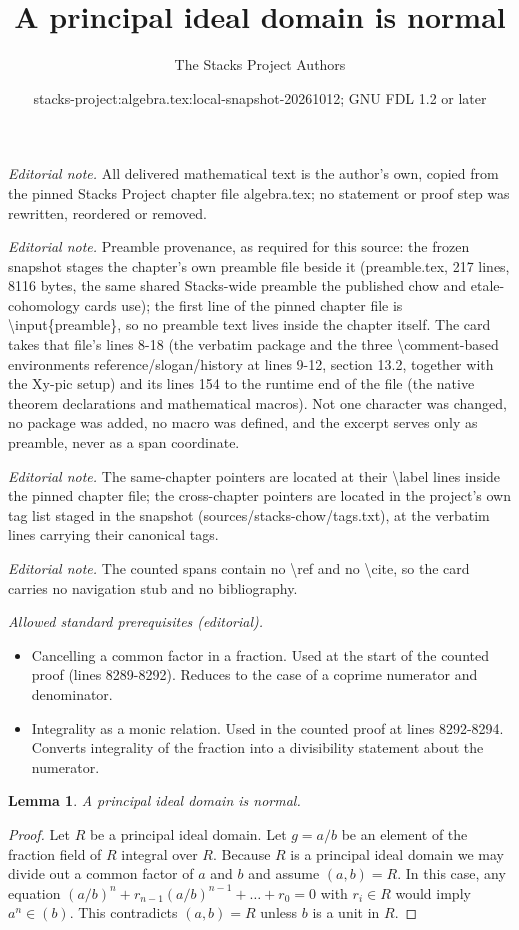 \documentclass[10pt,a4paper]{amsart}
\title{A principal ideal domain is normal}
\author{The Stacks Project Authors}
\date{stacks-project:algebra.tex:local-snapshot-20261012; GNU FDL 1.2 or later}
\theoremstyle{plain}
\newtheorem{lemma}[subsection]{Lemma}
\theoremstyle{definition}
\theoremstyle{remark}
\numberwithin{equation}{subsection}
\begin{document}
\maketitle
\noindent\textit{Editorial note.} All delivered mathematical text is the author's own, copied from the pinned Stacks Project chapter file algebra.tex; no statement or proof step was rewritten, reordered or removed.\par\medskip
\noindent\textit{Editorial note.} Preamble provenance, as required for this source: the frozen snapshot stages the chapter's own preamble file beside it (preamble.tex, 217 lines, 8116 bytes, the same shared Stacks-wide preamble the published chow and etale-cohomology cards use); the first line of the pinned chapter file is \textbackslash{}input\{preamble\}, so no preamble text lives inside the chapter itself. The card takes that file's lines 8-18 (the verbatim package and the three \textbackslash{}comment-based environments reference/slogan/history at lines 9-12, section 13.2, together with the Xy-pic setup) and its lines 154 to the runtime end of the file (the native theorem declarations and mathematical macros). Not one character was changed, no package was added, no macro was defined, and the excerpt serves only as preamble, never as a span coordinate.\par\medskip
\noindent\textit{Editorial note.} The same-chapter pointers are located at their \textbackslash{}label lines inside the pinned chapter file; the cross-chapter pointers are located in the project's own tag list staged in the snapshot (sources/stacks-chow/tags.txt), at the verbatim lines carrying their canonical tags.\par\medskip
\noindent\textit{Editorial note.} The counted spans contain no \textbackslash{}ref and no \textbackslash{}cite, so the card carries no navigation stub and no bibliography.\par\medskip
\noindent\textit{Allowed standard prerequisites (editorial).}\begin{itemize}
\item Cancelling a common factor in a fraction. Used at the start of the counted proof (lines 8289-8292). Reduces to the case of a coprime numerator and denominator.
\item Integrality as a monic relation. Used in the counted proof at lines 8292-8294. Converts integrality of the fraction into a divisibility statement about the numerator.
\end{itemize}\medskip
\begin{lemma}
\label{lemma-PID-normal}
A principal ideal domain is normal.
\end{lemma}

\begin{proof}
Let $R$ be a principal ideal domain.
Let $g = a/b$ be an element of the fraction field
of $R$ integral over $R$. Because $R$ is a principal ideal domain
we may divide out a common factor of $a$ and $b$
and assume $(a, b) = R$. In this case, any equation
$(a/b)^n + r_{n-1} (a/b)^{n-1} + \ldots + r_0 = 0$
with $r_i \in R$ would imply $a^n \in (b)$. This
contradicts $(a, b) = R$ unless $b$ is a unit in $R$.
\end{proof}
\end{document}
